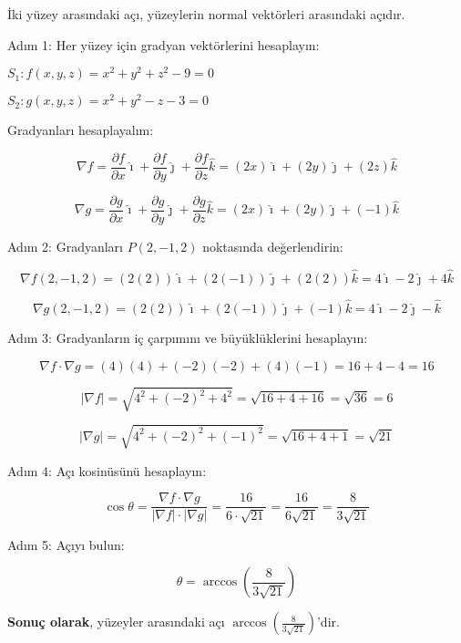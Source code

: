 \documentclass[]{fenbil}
\begin{document}
İki yüzey arasındaki açı, yüzeylerin normal vektörleri arasındaki açıdır.

Adım 1: Her yüzey için gradyan vektörlerini hesaplayın:

$S_1: f(x, y, z) = x^2 + y^2 + z^2 - 9 = 0$

$S_2: g(x, y, z) = x^2 + y^2 - z - 3 = 0$

Gradyanları hesaplayalım:

\[
\nabla f = \frac{\partial f}{\partial x}\hat{\imath} + \frac{\partial f}{\partial y}\hat{\jmath} + \frac{\partial f}{\partial z}\hat{k} = (2x)\hat{\imath} + (2y)\hat{\jmath} + (2z)\hat{k}
\]

\[
\nabla g = \frac{\partial g}{\partial x}\hat{\imath} + \frac{\partial g}{\partial y}\hat{\jmath} + \frac{\partial g}{\partial z}\hat{k} = (2x)\hat{\imath} + (2y)\hat{\jmath} + (-1)\hat{k}
\]

Adım 2: Gradyanları $P(2, -1, 2)$ noktasında değerlendirin:

\[
\nabla f(2, -1, 2) = (2(2))\hat{\imath} + (2(-1))\hat{\jmath} + (2(2))\hat{k} = 4\hat{\imath} - 2\hat{\jmath} + 4\hat{k}
\]

\[
\nabla g(2, -1, 2) = (2(2))\hat{\imath} + (2(-1))\hat{\jmath} + (-1)\hat{k} = 4\hat{\imath} - 2\hat{\jmath} - \hat{k}
\]

Adım 3: Gradyanların iç çarpımını ve büyüklüklerini hesaplayın:

\[
\nabla f \cdot \nabla g = (4)(4) + (-2)(-2) + (4)(-1) = 16 + 4 - 4 = 16
\]

\[
|\nabla f| = \sqrt{4^2 + (-2)^2 + 4^2} = \sqrt{16 + 4 + 16} = \sqrt{36} = 6
\]

\[
|\nabla g| = \sqrt{4^2 + (-2)^2 + (-1)^2} = \sqrt{16 + 4 + 1} = \sqrt{21}
\]

Adım 4: Açı kosinüsünü hesaplayın:

\[
\cos{\theta} = \frac{\nabla f \cdot \nabla g}{|\nabla f| \cdot |\nabla g|} = \frac{16}{6 \cdot \sqrt{21}} = \frac{16}{6\sqrt{21}} = \frac{8}{3\sqrt{21}}
\]

Adım 5: Açıyı bulun:

\[
\theta = \arccos{\left(\frac{8}{3\sqrt{21}}\right)}
\]

\textbf{Sonuç olarak}, yüzeyler arasındaki açı $\arccos{\left(\frac{8}{3\sqrt{21}}\right)}$'dir.
\end{document}

